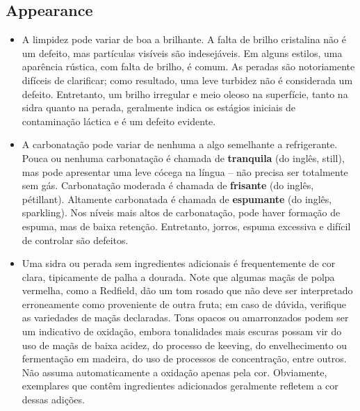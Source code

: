 \subsection*{Appearance}

\begin{itemize}
\item A limpidez pode variar de boa a brilhante. A falta de brilho cristalina não é um defeito, mas partículas visíveis são indesejáveis. Em alguns estilos, uma aparência rústica, com falta de brilho, é comum. As peradas são notoriamente difíceis de clarificar; como resultado, uma leve turbidez não é considerada um defeito. Entretanto, um brilho irregular e meio oleoso na superfície, tanto na sidra quanto na perada, geralmente indica os estágios iniciais de contaminação láctica e é um defeito evidente.
\item A carbonatação pode variar de nenhuma a algo semelhante a refrigerante. Pouca ou nenhuma carbonatação é chamada de \textbf{tranquila} (do inglês, still), mas pode apresentar uma leve cócega na língua – não precisa ser totalmente sem gás. Carbonatação moderada é chamada de \textbf{frisante} (do inglês, pétillant). Altamente carbonatada é chamada de \textbf{espumante} (do inglês, sparkling). Nos níveis mais altos de carbonatação, pode haver formação de espuma, mas de baixa retenção. Entretanto, jorros, espuma excessiva e difícil de controlar são defeitos.
\item Uma sidra ou perada sem ingredientes adicionais é frequentemente de cor clara, tipicamente de palha a dourada. Note que algumas maçãs de polpa vermelha, como a Redfield, dão um tom rosado que não deve ser interpretado erroneamente como proveniente de outra fruta; em caso de dúvida, verifique as variedades de maçãs declaradas. Tons opacos ou amarronzados podem ser um indicativo de oxidação, embora tonalidades mais escuras possam vir do uso de maçãs de baixa acidez, do processo de keeving, do envelhecimento ou fermentação em madeira, do uso de processos de concentração, entre outros. Não assuma automaticamente a oxidação apenas pela cor. Obviamente, exemplares que contêm ingredientes adicionados geralmente refletem a cor dessas adições.
\end{itemize}
